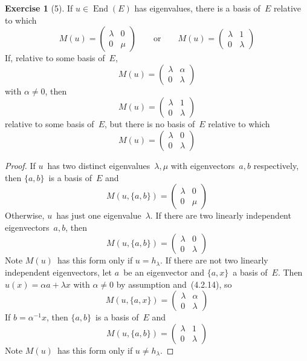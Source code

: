 \documentclass[letterpaper,12pt]{article}
\DeclareMathOperator{\End}{End}
\theoremstyle{definition}
\newtheorem*{exer}{Exercise}
\theoremstyle{remark}
\begin{document}
\begin{exer}[5]
If \(u\in\End(E)\) has eigenvalues, there is a basis of~\(E\) relative to which
\[M(u)=\begin{pmatrix}
\lambda&0\\
0&\mu
\end{pmatrix}
\qquad\text{or}\qquad
M(u)=\begin{pmatrix}
\lambda&1\\
0&\lambda
\end{pmatrix}\]
If, relative to some basis of~\(E\),
\[M(u)=\begin{pmatrix}
\lambda&\alpha\\
0&\lambda
\end{pmatrix}\]
with \(\alpha\ne 0\), then
\[M(u)=\begin{pmatrix}
\lambda&1\\
0&\lambda
\end{pmatrix}\]
relative to some basis of~\(E\), but there is no basis of~\(E\) relative to which
\[M(u)=\begin{pmatrix}
\lambda&0\\
0&\lambda
\end{pmatrix}\]
\end{exer}
\begin{proof}
If \(u\)~has two distinct eigenvalues~\(\lambda,\mu\) with eigenvectors~\(a,b\) respectively, then \(\{a,b\}\)~is a basis of~\(E\) and
\[M(u,\{a,b\})=\begin{pmatrix}
\lambda&0\\
0&\mu
\end{pmatrix}\]
Otherwise, \(u\)~has just one eigenvalue~\(\lambda\). If there are two linearly independent eigenvectors~\(a,b\), then
\[M(u,\{a,b\})=\begin{pmatrix}
\lambda&0\\
0&\lambda
\end{pmatrix}\]
Note \(M(u)\)~has this form only if \(u=h_{\lambda}\). If there are not two linearly independent eigenvectors, let \(a\)~be an eigenvector and \(\{a,x\}\)~a basis of~\(E\). Then \(u(x)=\alpha a+\lambda x\) with \(\alpha\ne 0\) by assumption and~(4.2.14), so
\[M(u,\{a,x\})=\begin{pmatrix}
\lambda&\alpha\\
0&\lambda
\end{pmatrix}\]
If \(b=\alpha^{-1}x\), then \(\{a,b\}\)~is a basis of~\(E\) and
\[M(u,\{a,b\})=\begin{pmatrix}
\lambda&1\\
0&\lambda
\end{pmatrix}\]
Note \(M(u)\)~has this form only if \(u\ne h_{\lambda}\).
\end{proof}
\end{document}
